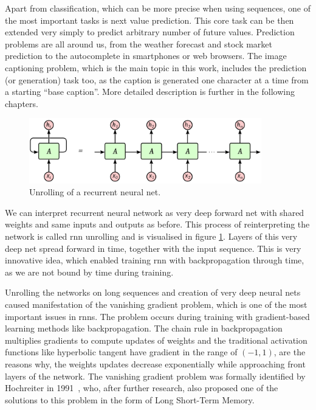 Apart from classification, which can be more precise when using sequences, one of the most important tasks is next value prediction. This core task can be then extended very simply to predict arbitrary number of future values. Prediction problems are all around us, from the weather forecast and stock market prediction to the autocomplete in smartphones or web browsers. The image captioning problem, which is the main topic in this work, includes the prediction (or generation) task too, as the caption is generated one character at a time from a starting \textquotedblleft base caption\textquotedblright. More detailed description is further in the following chapters.

\begin{figure}[!t]
	\centering
	\includegraphics[width=0.9\textwidth]{fig/rnn-unrolled.pdf}
	\caption{Unrolling of a recurrent neural net.
		\label{fig:rnn-unroll}}
\end{figure}

We can interpret recurrent neural network as very deep forward net with shared weights and same inputs and outputs as before. This process of reinterpreting the network is called \gls{rnn} unrolling and is visualised in figure \ref{fig:rnn-unroll}. Layers of this very deep net spread forward in time, together with the input sequence. This is very innovative idea, which enabled training \gls{rnn} with backpropagation through time, as we are not bound by time during training.

Unrolling the networks on long sequences and creation of very deep neural nets caused manifestation of the vanishing gradient problem, which is one of the most important issues in \gls{rnn}s. The problem occurs during training with gradient-based learning methods like backpropagation. The chain rule in backpropagation multiplies gradients  to compute updates of weights and the traditional activation functions like hyperbolic tangent have gradient in the range of $ (-1, 1) $, are the reasons why, the weights updates decrease exponentially while approaching front layers of the network. The vanishing gradient problem was formally identified by Hochreiter in 1991~\cite{hochreiter1991untersuchungen}, who, after further research, also proposed one of the solutions to this problem in the form of Long Short-Term Memory.

